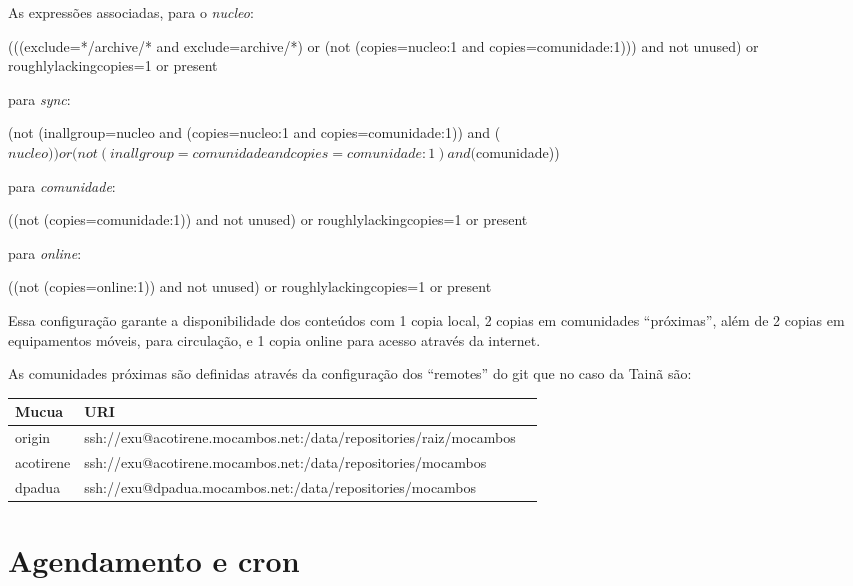 As expressões associadas, para o \emph{nucleo}:\\
\begin{code}
(((exclude=*/archive/* and exclude=archive/*) or (not
(copies=nucleo:1 and copies=comunidade:1))) and not unused) or
roughlylackingcopies=1 or present
\end{code}

para \emph{sync}:\\
\begin{code}
(not (inallgroup=nucleo and (copies=nucleo:1 and copies=comunidade:1)) 
and ($nucleo)) or (not (inallgroup=comunidade and copies=comunidade:1)
and ($comunidade))
\end{code}

para \emph{comunidade}:\\
\begin{code}
((not (copies=comunidade:1)) and not unused) or
roughlylackingcopies=1 or present
\end{code}

para \emph{online}:\\
\begin{code}
((not (copies=online:1)) and not unused) or
roughlylackingcopies=1 or present
\end{code}



Essa configuração garante a disponibilidade dos conteúdos com 1 copia
local, 2 copias em comunidades ``próximas'', além de 2 copias em
equipamentos móveis, para circulação, e 1 copia online para acesso
através da internet.

As comunidades próximas são definidas através da configuração
dos ``remotes'' do git que no caso da Tainã são:
\begin{table}[h]
  \centering
  \begin{tabularx}{\textwidth}{ X | l  X  }
    \textbf{Mucua} & \textbf{URI} \\ [0.5ex]
    \hline
    origin & ssh://exu@acotirene.mocambos.net:/data/repositories/raiz/mocambos \\
    acotirene & ssh://exu@acotirene.mocambos.net:/data/repositories/mocambos \\
    dpadua & ssh://exu@dpadua.mocambos.net:/data/repositories/mocambos \\
    \hline  
  \end{tabularx}
\end{table}


\section{Agendamento e cron}

